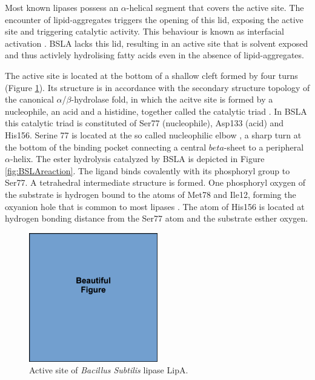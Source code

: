 \documentclass[english, a4paper, 12pt, titlepage, draft]{article}
\begin{document}
Most known lipases possess an $\alpha$-helical segment that covers the active site.
The encounter of lipid-aggregates triggers the opening of this lid, exposing the active site and triggering catalytic activity.
This behaviour is known as interfacial activation \cite{alphaBetaHydrolases}.
BSLA lacks this lid, resulting in an active site that is solvent exposed and thus activlely hydrolising fatty acids even in the absence of lipid-aggregates.

The active site is located at the bottom of a shallow cleft formed by four turns (Figure \ref{fig:BSLAactiveSite}).
Its structure is in accordance with the secondary structure topology of the canonical $\alpha$/$\beta$-hydrolase fold, in which the acitve site is formed by a nucleophile, an acid and a histidine, together called the catalytic triad \cite{BSLA_1I6W}.
In BSLA this catalytic triad is constituted of Ser77 (nucleophile), Asp133 (acid) and His156.
Serine 77 is located at the so called nucleophilic elbow \cite{nucleophileElbow}, a sharp turn at the bottom of the binding pocket connecting a central $beta$-sheet to a peripheral $\alpha$-helix.
The ester hydrolysis catalyzed by BSLA is depicted in Figure \ref{fig:BSLAreaction}.
The ligand binds covalently with its phosphoryl group to Ser77.
A tetrahedral intermediate structure is formed.
One phosphoryl oxygen of the substrate is hydrogen bound to the  atoms of Met78 and Ile12, forming the oxyanion hole that is common to most lipases \cite{BSLA_1I6W}.
The  atom of His156 is located at hydrogen bonding distance from the Ser77  atom and the substrate esther oxygen.






\begin{figure}
    \centering
    \includegraphics[width=0.5\textwidth]{figures/draft/draft.pdf}
    \caption{Active site of \textit{Bacillus Subtilis} lipase LipA.}
    \label{fig:BSLAactiveSite}
\end{figure} 
\end{document}
